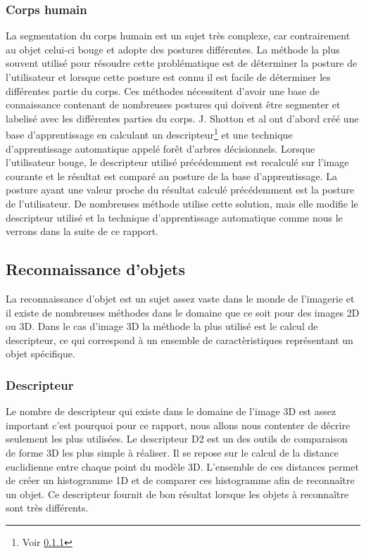 \subsubsection{Corps humain}
La segmentation du corps humain est un sujet très complexe, car contrairement au objet celui-ci bouge et adopte
des postures différentes. La méthode la plus souvent utilisé pour résoudre cette problématique est de déterminer
la posture de l'utilisateur et lorsque cette posture est connu il est facile de déterminer les différentes partie
du corps. Ces méthodes nécessitent d'avoir une base de connaissance contenant de nombreuses postures qui doivent
être segmenter et labelisé avec les différentes parties du corps. J. Shotton et al\cite{kinectSegmentation} ont
d'abord créé une base d'apprentissage en calculant un descripteur\footnote{Voir \ref{descriptor}}
et une technique d'apprentissage automatique appelé forêt d'arbres décisionnels\cite{randomDecisionForest}. 
Lorsque l'utilisateur bouge, le descripteur utilisé précédemment est recalculé sur l'image courante et le résultat 
est comparé au posture de la base d'apprentissage. La posture ayant une valeur proche du résultat calculé précédemment 
est la posture de l'utilisateur. De nombreuses méthode utilise cette solution, mais elle modifie le descripteur
utilisé et la technique d'apprentissage automatique comme nous le verrons dans la suite de ce rapport.

\subsection{Reconnaissance d'objets}
La reconnaissance d'objet est un sujet assez vaste dans le monde de l'imagerie et il existe de nombreuses
méthodes dans le domaine que ce soit pour des images 2D ou 3D. Dans le cas d'image 3D la méthode la plus utilisé
est le calcul de descripteur, ce qui correspond à un ensemble de caractèristiques représentant un objet spécifique.

\subsubsection{Descripteur}
\label{descriptor}
Le nombre de descripteur qui existe dans le domaine de l'image 3D est assez important c'est pourquoi pour ce rapport,
nous allons nous contenter de décrire seulement les plus utilisées. Le descripteur D2\cite{D2} est un des outils de 
comparaison de forme 3D les plus simple à réaliser. Il se repose sur le calcul de la distance euclidienne entre 
chaque point du modèle 3D. L'ensemble de ces distances permet de créer un histogramme 1D et de comparer ces histogramme
afin de reconnaître un objet. Ce descripteur fournit de bon résultat lorsque les objets à reconnaître sont très 
différents.\\

